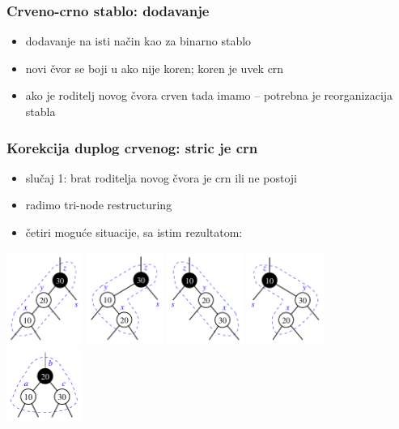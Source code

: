 \documentclass[compress]{beamer}
\begin{document}
\begin{frame}[fragile]
  \frametitle{Crveno-crno stablo: dodavanje}
  \begin{itemize}
    \item dodavanje na isti način kao za binarno stablo 
    \item novi čvor se boji u  ako nije koren; koren je uvek crn
      \item ako je roditelj novog čvora crven tada imamo  -- potrebna je reorganizacija stabla
  \end{itemize}
\end{frame}

\begin{frame}[fragile]
  \frametitle{Korekcija duplog crvenog: stric je crn}
  \begin{itemize}
    \item slučaj 1: brat roditelja novog čvora je crn ili ne postoji
    \item radimo tri-node restructuring
    \item četiri moguće situacije, sa istim rezultatom:
  \end{itemize}
  \begin{center}
    \includegraphics[width=2.5cm]{asp-11-pic39a.pdf}
    \includegraphics[width=2.5cm]{asp-11-pic39b.pdf}
    \includegraphics[width=2.5cm]{asp-11-pic39c.pdf}
    \includegraphics[width=2.5cm]{asp-11-pic39d.pdf} \\
    \includegraphics[width=2.5cm]{asp-11-pic39e.pdf}
  \end{center}
\end{frame}
\end{document}
